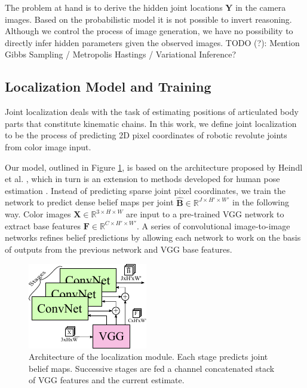\documentclass[conference]{IEEEtran}
\begin{document}
    The problem at hand is to derive the hidden joint locations $\mathbf{Y}$ in the camera images. Based on the probabilistic model it is not possible to invert reasoning. Although we control the process of image generation, we have no possibility to directly infer hidden parameters given the observed images. TODO (?): Mention Gibbs Sampling / Metropolis Hastings / Variational Inference?
    

\subsection{Localization Model and Training}

    Joint localization deals with the task of estimating positions of articulated body parts that constitute kinematic chains. In this work, we define joint localization to be the process of predicting 2D pixel coordinates of robotic revolute joints from color image input. 
    
    Our model, outlined in Figure \ref{fig:jointmodel}, is based on the architecture proposed by Heindl et al. \cite{cheind2019disp}, which in turn is an extension to methods developed for human pose estimation \cite{cao2017realtime, newell2016stacked}. Instead of predicting sparse joint pixel coordinates, we train the network to predict dense belief maps per joint $\hat{\mathbf{B}} \in \mathbb{R}^{J \times H' \times W'}$ in the following way. Color images $\mathbf{X} \in \mathbb{R}^{3 \times H\times W}$ are input to a pre-trained VGG network \cite{simonyan2014very} to extract base features $\mathbf{F} \in \mathbb{R}^{C \times H' \times W'}$. A series of convolutional image-to-image networks refines belief predictions by allowing each network to work on the basis of outputs from the previous network and VGG base features.

    \begin{figure} [!h]
        \centering
        \includegraphics[width=0.7\columnwidth]{figures/joint_model/joint_model.pdf}
        \caption {
            \label{fig:jointmodel} 
            Architecture of the localization module. Each stage predicts joint belief maps. Successive stages are fed a channel concatenated stack of VGG features and the current estimate.
        }
    \end{figure}
\end{document}
